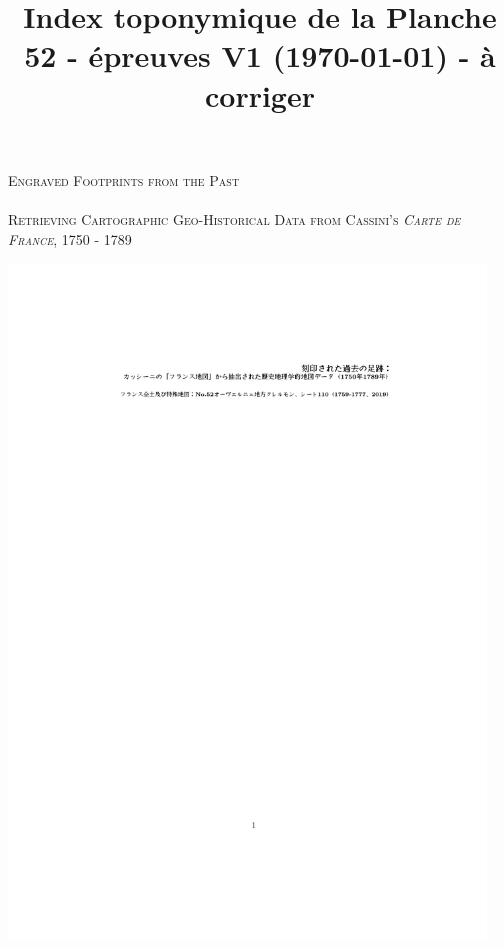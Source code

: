 \documentclass[portrait,a0]{sciposter}
\title{Index toponymique de la Planche 52 - épreuves V1 (\today) - à corriger}
\institute{EHESS}
\begin{document}
\makeatletter
\conference{\bf \@title}
\makeatother
\bgroup
\setlength{\parindent}{-0.1em} 
\begin{minipage}[t]{0.55\textwidth}
  \Huge
  \textsc{Engraved Footprints from the Past}\\~\\
  \Large \textsc{Retrieving Cartographic Geo-Historical Data from Cassini’s \emph{Carte de France}, 1750 - 1789}
\end{minipage}
\begin{minipage}[t]{0.44\textwidth}
  \vspace*{-3.2cm}
  \hfill
  \includegraphics[width=0.95\textwidth, trim= 5cm 26cm 4cm 22cm, clip]{gfx/jap.pdf}
\end{minipage}
\egroup
\end{document}
